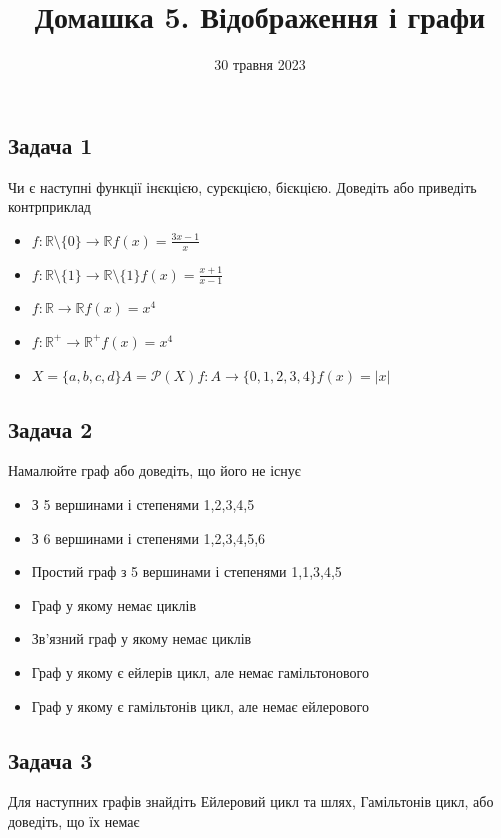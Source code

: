 \documentclass{article}
\begin{document}
\title{Домашка 5. Відображення і графи}
\date{30 травня 2023}

\maketitle

\subsection*{Задача 1}
Чи є наступні функції інєкцією, сурєкцією, бієкцією. Доведіть або приведіть контрприклад
\begin{itemize}
    \item $f: \mathbb{R} \setminus \{0\} \rightarrow \mathbb{R} f(x)=\frac{3x-1}{x}$
    \item $f: \mathbb{R} \setminus \{1\} \rightarrow \mathbb{R} \setminus \{1\} f(x)=\frac{x+1}{x-1}$
    \item $f: \mathbb{R} \rightarrow \mathbb{R} f(x)=x^4$
    \item $f: \mathbb{R}^+ \rightarrow \mathbb{R}^+ f(x)=x^4$
    \item $X=\{a,b,c,d\} A=\mathcal{P}(X) f: A \rightarrow \{0,1,2,3,4\} f(x) = |x|$
\end{itemize}

\subsection*{Задача 2}
Намалюйте граф або доведіть, що його не існує
\begin{itemize}
    \item З 5 вершинами і степенями 1,2,3,4,5
    \item З 6 вершинами і степенями 1,2,3,4,5,6
    \item Простий граф з 5 вершинами і степенями 1,1,3,4,5
    \item Граф у якому немає циклів
    \item Зв'язний граф у якому немає циклів
    \item Граф у якому є ейлерів цикл, але немає гамільтонового
    \item Граф у якому є гамільтонів цикл, але немає ейлерового
\end{itemize}

\subsection*{Задача 3}
Для наступних графів знайдіть Ейлеровий цикл та шлях, Гамільтонів цикл, або доведіть, що їх немає
\pagebreak
\end{document}
